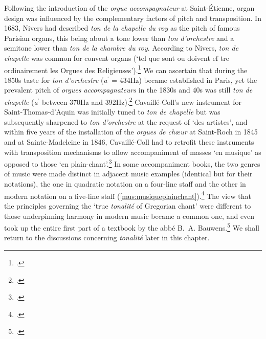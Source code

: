 Following the introduction of the \emph{orgue accompagnateur} at Saint-Étienne, organ design was influenced by the complementary factors of pitch and transposition.
In 1683, Nivers had described \textit{ton de la chapelle du roy} as the pitch of famous Parisian organs, this being about a tone lower than \textit{ton d'orchestre} and a semitone lower than \textit{ton de la chambre du roy}.
According to Nivers, \emph{ton de chapelle} was common for convent organs (`tel que sont ou doivent eſ\kern -0.5pt tre ordinairement les Orgues des Religieuses').\footcite[106]{NiversDissertationchantgregorien1683}
We can ascertain that during the 1850s taste for \textit{ton d'orchestre} (\emph{a}$^\prime$ = 434Hz) became established in Paris, yet the prevalent pitch of \emph{orgues accompagnateurs} in the 1830s and 40s was still \textit{ton de chapelle} (\emph{a}$^\prime$ between 370Hz and 392Hz).\footcite[97--8, 117, 330]{HaynesHistoryPerformingPitch2002}
Cavaillé-Coll's new instrument for Saint-Thomas-d'Aquin was initially tuned to \textit{ton de chapelle} but was subsequently sharpened to \textit{ton d'orchestre} at the request of `des artistes', and within five years of the installation of the \textit{orgues de chœur} at Saint-Roch in 1845 and at Sainte-Madeleine in 1846, Cavaillé-Coll had to retrofit these instruments with transposition mechanisms to allow accompaniment of masses `en musique' as opposed to those `en plain-chant'.\footcite[Cavaillé-Coll to M. l'abbé Pelletier, curate of Saint-Aignan d'Orléans, 28 June 1851, in][789]{DouglassCavailleCollmusiciansdocumented1980}
In some accompaniment books, the two genres of music were made distinct in adjacent music examples (identical but for their notations), the one in quadratic notation on a four-line staff and the other in modern notation on a five-line staff (\cref{mus:musiqueplainchant}).\footcite[26]{BruneauMethodesimplefacile1856}
The view that the principles governing the `true \emph{tonalité} of Gregorian chant' were different to those underpinning harmony in modern music became a common one, and even took up the entire first part of a textbook by the abbé B.~A. Bauwens.\footcite[p.~xiii]{Bauwensplainchantmisportee1861}
We shall return to the discussions concerning \emph{tonalité} later in this chapter.

